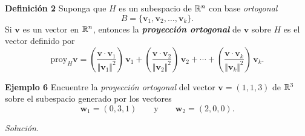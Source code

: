 {\nologo
\begin{frame}%
	
	\begin{defi}{\textbf{Definición 2}}
		\justifying
		Suponga que $H$ es un subespacio de $\mathbb{R}^n$ con base \textit{ortogonal} 
		\[
		B = \{ \mathbf{v}_1, \mathbf{v}_2, \hdots, \mathbf{v}_k\}.
		\]
		Si $\mathbf{v}$ es un vector en $\mathbb{R}^n$, entonces la \textbf{\textit{proyección ortogonal}} de $\mathbf{v}$ sobre $H$
		es el vector definido por
		\[
		\text{proy}_H \mathbf{v} = \left( \frac{\mathbf{v}\cdot \mathbf{v}_1}{\Vert \mathbf{v}_1 \Vert^2} \right)\, \mathbf{v}_1 + 
		\left( \frac{\mathbf{v}\cdot \mathbf{v}_2}{\Vert \mathbf{v}_2 \Vert^2} \right)\, \mathbf{v}_2 + \cdots 
		+ \left( \frac{\mathbf{v}\cdot \mathbf{v}_k}{\Vert \mathbf{v}_k \Vert^2} \right)\, \mathbf{v}_k.
		\]
		
		\vspace{-1mm}
	\end{defi}	
	
	\begin{ej}{\textbf{Ejemplo 6}}\justifying 
		Encuentre la \textit{proyección ortogonal} del vector $\mathbf{v}=(1,1,3)$ de $\mathbb{R}^3$ sobre el subespacio generado por los vectores
		\[
		\mathbf{w}_1 = (0,3,1) \qquad \text{y} \qquad \mathbf{w}_2 = (2,0,0).
		\]
	\end{ej}
	\textit{Solución}.
	
\end{frame}
}


\subsection{}

